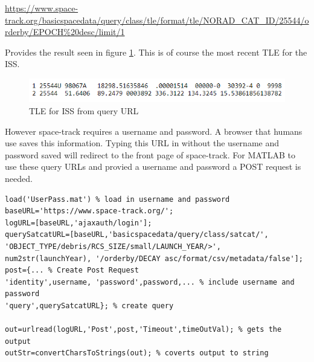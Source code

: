 \documentclass[12pt]{article}
\begin{document}
\url{https://www.space-track.org/basicspacedata/query/class/tle/format/tle/NORAD_CAT_ID/25544/orderby/EPOCH%20desc/limit/1}
	
	Provides the result seen in figure \ref{fig:isstle}. This is of course the most recent TLE for the ISS.
	
	\begin{figure}[H]
		\centering
		\includegraphics[width=0.7\linewidth]{ISS_tle}
		\caption{TLE for ISS from query URL}
		\label{fig:isstle}
	\end{figure}

However space-track requires a username and password. A browser that humans use saves this information. Typing this URL in without the username and password saved will redirect to the front page of space-track. For MATLAB to use these query URLs and provied a username and password a POST request is needed. \par 



	
	

\singlespacing
\begin{lstlisting}
load('UserPass.mat') % load in username and password
baseURL='https://www.space-track.org/';
logURL=[baseURL,'ajaxauth/login'];
querySatcatURL=[baseURL,'basicspacedata/query/class/satcat/', 'OBJECT_TYPE/debris/RCS_SIZE/small/LAUNCH_YEAR/>', num2str(launchYear), '/orderby/DECAY asc/format/csv/metadata/false'];
post={... % Create Post Request
'identity',username, 'password',password,... % include username and password
'query',querySatcatURL}; % create query

out=urlread(logURL,'Post',post,'Timeout',timeOutVal); % gets the output
outStr=convertCharsToStrings(out); % coverts output to string

\end{lstlisting}
\doublespacing
\end{document}
